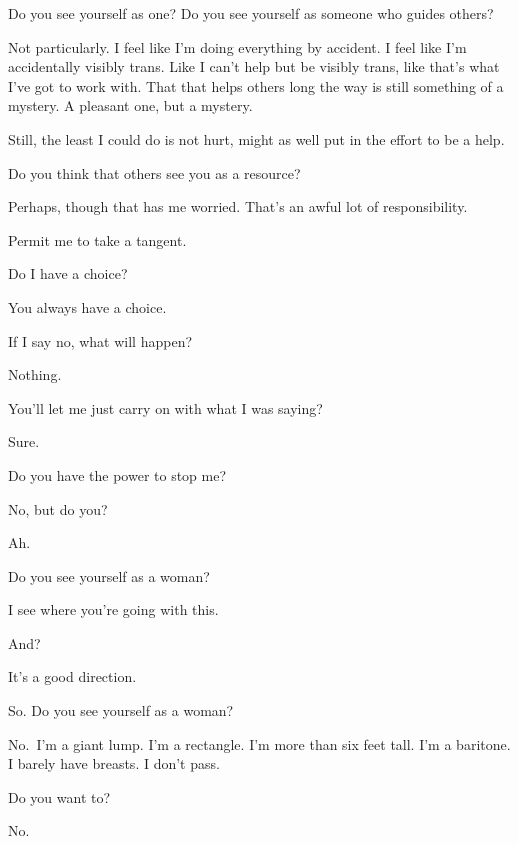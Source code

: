 \begin{paracol}{2}
\begin{leftcolumn}
\begin{ally}
Do you see yourself as one? Do you see yourself as someone who guides others?
\end{ally}
Not particularly. I feel like I'm doing everything by accident. I feel like I'm accidentally visibly trans. Like I can't help but be visibly trans, like that's what I've got to work with. That that helps others long the way is still something of a mystery. A pleasant one, but a mystery.

Still, the least I could do is not hurt, might as well put in the effort to be a help.

\begin{ally}
Do you think that others see you as a resource?
\end{ally}
Perhaps, though that has me worried. That's an awful lot of responsibility.

\begin{ally}
Permit me to take a tangent.
\end{ally}
Do I have a choice?

\begin{ally}
You always have a choice.
\end{ally}
If I say no, what will happen?

\begin{ally}
Nothing.
\end{ally}
You'll let me just carry on with what I was saying?

\begin{ally}
Sure.
\end{ally}
Do you have the power to stop me?

\begin{ally}
No, but do you?
\end{ally}
Ah.
\newpage

\begin{ally}
Do you see yourself as a woman?
\end{ally}
I see where you're going with this.

\begin{ally}
And?
\end{ally}
It's a good direction.

\begin{ally}
So. Do you see yourself as a woman?
\end{ally}
No.~I'm a giant lump. I'm a rectangle. I'm more than six feet tall. I'm a baritone. I barely have breasts. I don't pass.

\begin{ally}
Do you want to?
\end{ally}
No.


\end{leftcolumn}
\end{paracol}
